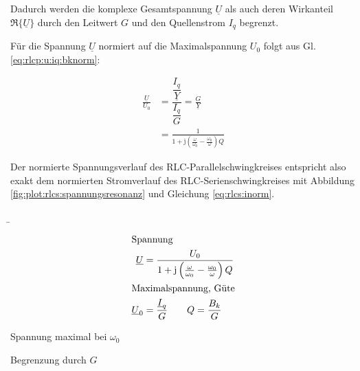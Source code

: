 \begin{frame}
{    Dadurch werden die komplexe Gesamtspannung $\underline{U}$ als auch deren Wirkanteil $\Re\{\underline{U}\}$ 
    durch den Leitwert $G$ und den Quellenstrom $I_q$ begrenzt.

    Für die Spannung $\underline{U}$ normiert auf die Maximalspannung $U_0$ folgt aus Gl. \ref{eq:rlcp:u:iq:bknorm}:

    \begin{equation}\label{eq:rlcp:unorm}
        \begin{aligned}
            \frac{\underline{U}}{U_0} 
            &= \dfrac{\dfrac{I_q}{\underline{Y}}}{\dfrac{I_q}{G}} 
            =  \frac{G}{\underline{Y}}\\
            &= \frac{1}{1 + \mathrm{j} \left(\frac{\omega}{\omega_0} - \frac{\omega_0}{\omega}\right) Q}
        \end{aligned}
    \end{equation}

    Der normierte Spannungsverlauf des RLC-Parallelschwingkreises entspricht also 
    exakt dem normierten Stromverlauf des RLC-Serienschwingkreises mit Abbildung \ref{fig:plot:rlcs:spannungsresonanz}
    und Gleichung \ref{eq:rlcs:inorm}.
}%
\b{%
    \begin{minipage}{0.3\textwidth}%
    \begin{align*}
        \intertext{Spannung}
        \underline{U} &= \frac{U_0}{1 + \mathrm{j}\left(\frac{\omega}{\omega_0} - \frac{\omega_0}{\omega}\right)Q}\\
        \intertext{Maximalspannung, Güte}
        \underline{U}_0 &= \frac{\underline{I}_q}{G}
        \qquad Q = \frac{B_k}{G}        
    \end{align*}
    \end{minipage}\hfill%
    \begin{minipage}{0.65\textwidth}\centering
        \par Spannung maximal bei $\omega_0$
        \par Begrenzung durch $G$
    \end{minipage}
}
\end{frame}


